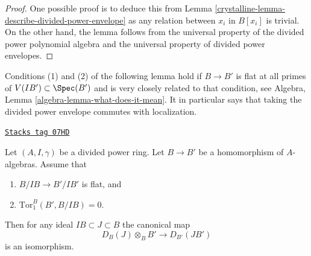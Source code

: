 \begin{proof}

One possible proof is to deduce this from
Lemma \ref{crystalline-lemma-describe-divided-power-envelope}
as any relation between $x_i$ in $B[x_i]$ is trivial.
On the other hand, the lemma follows from the universal property
of the divided power polynomial algebra and the universal property of
divided power envelopes.
\end{proof}

Conditions (1) and (2) of the following lemma hold if $B \to B'$ is flat
at all primes of $V(IB') \subset \Spec(B')$ and is very closely related
to that condition, see
Algebra, Lemma \ref{algebra-lemma-what-does-it-mean}.
It in particular says that taking the divided power
envelope commutes with localization.

\begin{lemma}
\label{crystalline-lemma-flat-base-change-divided-power-envelope}
\href{https://stacks.math.columbia.edu/tag/07HD}{\texttt{Stacks tag 07HD}}

Let $(A, I, \gamma)$ be a divided power ring.
Let $B \to B'$ be a homomorphism of $A$-algebras.
Assume that
\begin{enumerate}
\item $B/IB \to B'/IB'$ is flat, and
\item $\text{Tor}_1^B(B', B/IB) = 0$.
\end{enumerate}
Then for any ideal $IB \subset J \subset B$ the canonical map
$$
D_B(J) \otimes_B B' \longrightarrow D_{B'}(JB')
$$
is an isomorphism.
\end{lemma}

